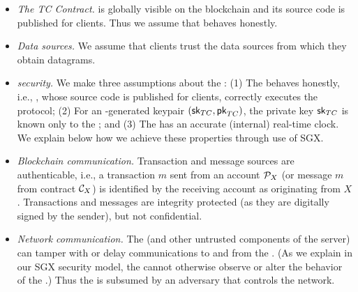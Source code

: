 \begin{itemize}
  \setlength{\itemsep}{2pt}
  \setlength{\parskip}{0pt}
  \setlength{\parsep}{0pt}

\item {\em The TC Contract.} \tcont is globally visible on the blockchain and its source code is published for clients. Thus we assume that \tcont behaves honestly.

\item {\em Data sources.} We assume that clients trust the data sources from which they obtain \tc datagrams.

\item {\em \encname security.} We make three assumptions about the \encname : (1) The \encname behaves honestly, i.e., \engine, whose source code is published for clients, correctly executes the \tc protocol; (2) For an \encname-generated keypair $({\sf sk}_{TC}, {\sf pk}_{TC})$, the private key ${\sf sk}_{TC}$ is known only to the \encname; and (3) The \encname has an accurate (internal) real-time clock. We explain below how we achieve these properties through use of SGX. 


\item {\em Blockchain communication.} Transaction and message sources are authenticable, i.e., a transaction $m$ sent from an account ${\cal P}_{X}$ (or message $m$ from contract ${\cal C}_{X}$) is identified by the receiving account as originating from $X$. Transactions and messages are integrity protected (as they are digitally signed by the sender), but not confidential. 

\item {\em Network communication.} The \medname (and other untrusted components of the \tc server) can tamper with or delay communications to and from the \encname. (As we explain in our SGX security model, the \medname cannot otherwise observe or alter the behavior of the \encname.) Thus the \medname is subsumed by an adversary that controls the network. 

\end{itemize}












